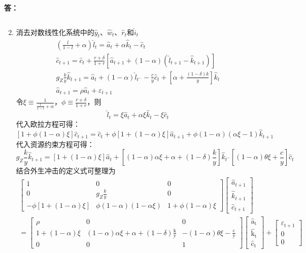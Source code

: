 \documentclass[12pt, a4paper, oneside]{article}
\newcounter{answername}
\newenvironment{answer}{\stepcounter{answername}\par\noindent\textbf{答：}}{\par}
\begin{document}
\begin{CJK*}{UTF8}{gbsn}
\begin{answer}
\begin{enumerate}
$$			$$
		\item 消去对数线性化系统中的$\hat{y}_t$、$\hat{w}_t$、$\hat{r}_t$和$\hat{i}_t$
			$$
			\begin{array}{c}\left(\frac{l}{1-l}+\alpha\right) \hat{l}_{t}=\hat{a}_{t}+\alpha \hat{k}_{t}-\hat{c}_{t} \\ \hat{c}_{t+1}=\hat{c}_{t}+\frac{r+\delta}{1+r}\left[\hat{a}_{t+1}+(1-\alpha)\left(\hat{l}_{t+1}-\hat{k}_{t+1}\right)\right] \\ g_{Z} \frac{k}{y} \hat{k}_{t+1}=\hat{a}_{t}+(1-\alpha) \hat{l}_{t^{-}}-\frac{c}{y} \hat{c}_{t}+\left[\alpha+\frac{(1-\delta) k}{y}\right] \hat{k}_{t} \\ \hat{a}_{t+1}=\rho \hat{a}_{t}+\varepsilon_{t+1}\end{array}
			$$
			令$\xi \equiv \frac{1}{\frac{l}{1-l}+\alpha}$，$\phi \equiv \frac{r+\delta}{1+r}$，则
			$$\hat{l}_{t}=\xi \hat{a}_{t}+\alpha \xi \hat{k}_{t}-\xi \hat{c}_{t}$$
			代入欧拉方程可得：
			$$[1+\phi(1-\alpha) \xi] \hat{c}_{t+1}=\hat{c}_{t}+\phi[1+(1-\alpha) \xi] \hat{a}_{t+1}+\phi(1-\alpha)(\alpha \xi-1) \hat{k}_{t+1}$$
			代入资源约束方程可得：
			$$g_{Z} \frac{k}{y} \widehat{k}_{t+1}=[1+(1-\alpha) \xi] \hat{a}_{t}+\left[(1-\alpha) \alpha \xi+\alpha+(1-\delta) \frac{k}{y}\right] \hat{k}_{t^{-}}\left[(1-\alpha) \theta \xi+\frac{c}{y}\right] \hat{c}_{t}$$
			结合外生冲击的定义式可整理为
			$$
			\begin{array}{c}{\left[\begin{array}{ccc}1 & 0 & 0 \\ 0 & g_{Z} \frac{k}{y} & 0 \\ -\phi[1+(1-\alpha) \xi] & \phi(1-\alpha)(1-\alpha \xi) & 1+\phi(1-\alpha) \xi\end{array}\right]\left[\begin{array}{c}\hat{a}_{t+1} \\ \hat{k}_{t+1} \\ \hat{c}_{t+1}\end{array}\right]} \\ =\left[\begin{array}{ccc}\rho & 0 & 0 \\ 1+(1-\alpha) \xi & (1-\alpha) \alpha \xi+\alpha+(1-\delta) \frac{\mathrm{k}}{\mathrm{y}} & -(1-\alpha) \theta \xi-\frac{\mathrm{c}}{\mathrm{y}} \\ 0 & 0 & 1\end{array}\right]\left[\begin{array}{c}\hat{\mathrm{a}}_{\mathrm{t}} \\ \hat{\mathrm{k}}_{\mathrm{t}} \\ \hat{\mathrm{c}}_{\mathrm{t}}\end{array}\right]+\left[\begin{array}{c}\varepsilon_{\mathrm{t}+1} \\ 0 \\ 0\end{array}\right]\end{array}
$$
\end{enumerate}
\end{answer}
\end{CJK*}
\end{document}
